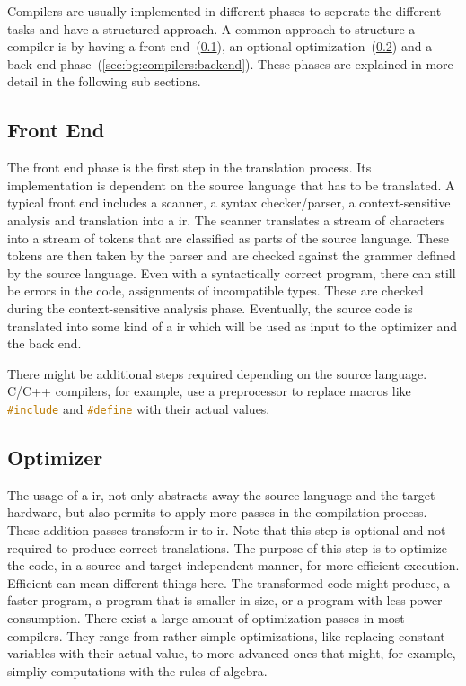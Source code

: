 Compilers are usually implemented in different phases to seperate the different tasks and have a structured approach.
A common approach to structure a compiler is by having a front end~(\cref{sec:bg:compilers:frontend}), an optional optimization~(\cref{sec:bg:compilers:optimizer}) and a back end phase~(\cref{sec:bg:compilers:backend}).
These phases are explained in more detail in the following sub sections.

\subsection{Front End}
\label{sec:bg:compilers:frontend}
The front end phase is the first step in the translation process.
Its implementation is dependent on the source language that has to be translated.
A typical front end includes a scanner, a syntax checker/parser, a context-sensitive analysis and translation into a \ac{ir}.
The scanner translates a stream of characters into a stream of tokens that are classified as parts of the source language.
These tokens are then taken by the parser and are checked against the grammer defined by the source language.
Even with a syntactically correct program, there can still be errors in the code, \eg assignments of incompatible types.
These are checked during the context-sensitive analysis phase.
Eventually, the source code is translated into some kind of a \ac{ir} which will be used as input to the optimizer and the back end.

There might be additional steps required depending on the source language.
C/C++ compilers, for example, use a preprocessor to replace macros like \lstinline[language=C]|#include| and \lstinline[language=C]|#define| with their actual values.

\subsection{Optimizer}
\label{sec:bg:compilers:optimizer}
The usage of a \ac{ir}, not only abstracts away the source language and the target hardware, but also permits to apply more passes in the compilation process.
These addition passes transform \ac{ir} to \ac{ir}.
Note that this step is optional and not required to produce correct translations.
The purpose of this step is to optimize the code, in a source and target independent manner, for more efficient execution.
Efficient can mean different things here. %
The transformed code might produce, \eg a faster program, a program that is smaller in size, or a program with less power consumption.
There exist a large amount of optimization passes in most compilers.
They range from rather simple optimizations, like replacing constant variables with their actual value, to more advanced ones that might, for example, simpliy computations with the rules of algebra.

